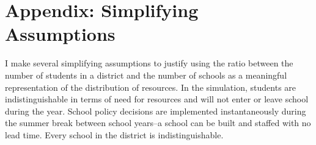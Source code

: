 \documentclass{article}
\begin{document}
\medskip

\printbibliography

\section*{Appendix: Simplifying Assumptions}
I make several simplifying assumptions to justify using the ratio between the number of students in a district and the number of schools as a meaningful representation of the distribution of resources.
In the simulation, students are indistinguishable in terms of need for resources and will not enter or leave school during the year.
School policy decisions are implemented instantaneously during the summer break between school years--a school can be built and staffed with no lead time. Every school in the district is indistinguishable. 
\end{document}
